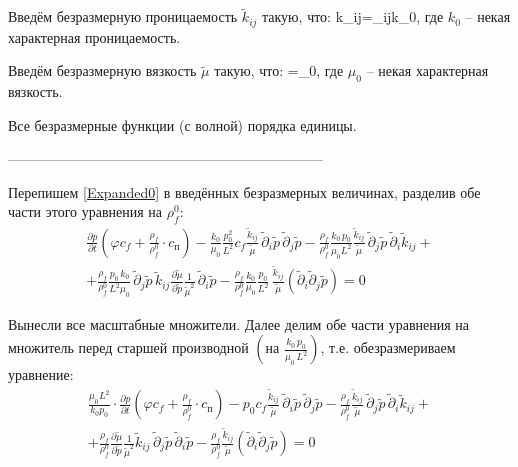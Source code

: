 \documentclass[main.tex]{subfiles}
\begin{document}
Введём безразмерную проницаемость $\tilde{k}_{ij}$ такую, что:
\beq
k_{ij}=_{ij}\cdot k_0,
\eeq
где $k_0$ -- некая характерная проницаемость.

Введём безразмерную вязкость $\tilde{\mu}$ такую, что:
\beq
\mu=\tilde{\mu}\cdot\mu_0,
\eeq
где $\mu_0$ -- некая характерная вязкость.

Все безразмерные функции (с волной) порядка единицы.

--------------------------------------------------------------------

Перепишем \eqref{Expanded0} в введённых безразмерных величинах, разделив обе части этого уравнения на $\rho_f^0$:
\begin{multline}
\frac{\partial p}{\partial t}\left(\varphi c_f+\frac{\rho_f}{\rho_f^0}\cdot c_\text{п}\right)-\frac{k_0}{\mu_0}\frac{p_0^2}{L^2}c_f\frac{\tilde{k}_{ij}}{\tilde{\mu}}\,\tilde{\partial}_i\tilde{p}\,\tilde{\partial}_j\tilde{p}-\frac{\rho_f}{\rho_f^0}\frac{k_0\,p_0}{\mu_0L^2}\frac{\tilde{k}_{ij}}{\tilde{\mu}}\,\tilde{\partial}_j\tilde{p}\,\tilde{\partial}_i\tilde{k}_{ij}+\\+\frac{\rho_f}{\rho_f^0}\frac{p_0\,k_0}{L^2\mu_0}\,\tilde{\partial}_j\tilde{p}\,\tilde{k}_{ij}\frac{\partial\tilde{\mu}}{\partial\tilde{p}}\frac{1}{\tilde{\mu}^2}\,\tilde{\partial}_i\tilde{p}-\frac{\rho_f}{\rho_f^0}\frac{k_0}{\mu_0}\frac{p_0}{L^2}\,\frac{\tilde{k}_{ij}}{\tilde{\mu}}\left(\tilde{\partial}_i\tilde{\partial}_j\tilde{p}\right)=0
\end{multline}

Вынесли все масштабные множители. Далее делим обе части уравнения на множитель перед старшей производной $\left(\text{на }\frac{k_0\,p_0}{\mu_0\,L^2}\right)$, т.е. обезразмериваем уравнение:
\begin{multline}\label{PiezoEqDiv0}
\frac{\mu_0L^2}{k_0p_0}\cdot\frac{\partial p}{\partial t}\left(\varphi c_f+\frac{\rho_f}{\rho_f^0}\cdot c_\text{п}\right)-p_0c_f\frac{\tilde{k}_{ij}}{\tilde{\mu}}\,\tilde{\partial}_i\tilde{p}\,\tilde{\partial}_j\tilde{p}-\frac{\rho_f}{\rho_f^0}\frac{\tilde{k}_{ij}}{\tilde{\mu}}\,\tilde{\partial}_j\tilde{p}\,\tilde{\partial}_i\tilde{k}_{ij}+\\+\frac{\rho_f}{\rho_f^0}\frac{\partial\tilde{\mu}}{\partial\tilde{p}}\frac{1}{\tilde{\mu}^2}\tilde{k}_{ij}\,\tilde{\partial}_j\tilde{p}\,\tilde{\partial}_i\tilde{p}-\frac{\rho_f}{\rho_f^0}\frac{\tilde{k}_{ij}}{\tilde{\mu}}\left(\tilde{\partial}_i\tilde{\partial}_j\tilde{p}\right)=0
\end{multline}
\end{document}
